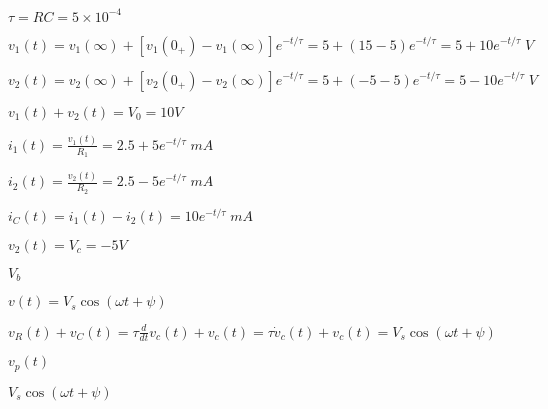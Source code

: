 \documentclass{article}
\def\lthtmlcheckvsize{\ifdim\ht\sizebox<\vsize 
  \ifdim\wd\sizebox<\hsize\expandafter\hfill\fi \expandafter\vfill
  \else\expandafter\vss\fi}%
\begin{document}
{\newpage\clearpage
{}%
$ \tau=RC=5\times 10^{-4}$%
\lthtmlindisplaymathZ
\lthtmlcheckvsize\clearpage}

{\newpage\clearpage
{}%
$\displaystyle v_1(t)=v_1(\infty)+[v_1(0_+)-v_1(\infty)]e^{-t/\tau}
=5+(15-5)e^{-t/\tau}=5+10e^{-t/\tau}\;V$%
\lthtmlindisplaymathZ
\lthtmlcheckvsize\clearpage}

{\newpage\clearpage
{}%
$\displaystyle v_2(t)=v_2(\infty)+[v_2(0_+)-v_2(\infty)]e^{-t/\tau}
=5+(-5-5)e^{-t/\tau}=5-10e^{-t/\tau}\;V$%
\lthtmlindisplaymathZ
\lthtmlcheckvsize\clearpage}

{\newpage\clearpage
{}%
$ v_1(t)+v_2(t)=V_0=10V$%
\lthtmlindisplaymathZ
\lthtmlcheckvsize\clearpage}

{\newpage\clearpage
{}%
$\displaystyle i_1(t)=\frac{v_1(t)}{R_1}=2.5+5e^{-t/\tau}\;mA$%
\lthtmlindisplaymathZ
\lthtmlcheckvsize\clearpage}

{\newpage\clearpage
{}%
$\displaystyle i_2(t)=\frac{v_2(t)}{R_2}=2.5-5e^{-t/\tau}\;mA$%
\lthtmlindisplaymathZ
\lthtmlcheckvsize\clearpage}

{\newpage\clearpage
{}%
$\displaystyle i_C(t)=i_1(t)-i_2(t)=10 e^{-t/\tau}\; mA$%
\lthtmlindisplaymathZ
\lthtmlcheckvsize\clearpage}

{\newpage\clearpage
{}%
$ v_2(t)=V_c=-5V$%
\lthtmlindisplaymathZ
\lthtmlcheckvsize\clearpage}

{\newpage\clearpage
{}%
$ V_b$%
\lthtmlindisplaymathZ
\lthtmlcheckvsize\clearpage}

{\newpage\clearpage
{}%
$ v(t)=V_s \cos(\omega t+\psi)$%
\lthtmlindisplaymathZ
\lthtmlcheckvsize\clearpage}

{\newpage\clearpage
{}%
$\displaystyle v_R(t)+v_C(t)=\tau\frac{d}{dt} v_c(t)+v_c(t)
=\tau\dot{v}_c(t)+v_c(t)=V_s \cos(\omega t+\psi)$%
\lthtmlindisplaymathZ
\lthtmlcheckvsize\clearpage}

{\newpage\clearpage
{}%
$ v_p(t)$%
\lthtmlindisplaymathZ
\lthtmlcheckvsize\clearpage}

{\newpage\clearpage
{}%
$ V_s\cos(\omega t+\psi)$%
\lthtmlindisplaymathZ
\lthtmlcheckvsize\clearpage}
\end{document}
